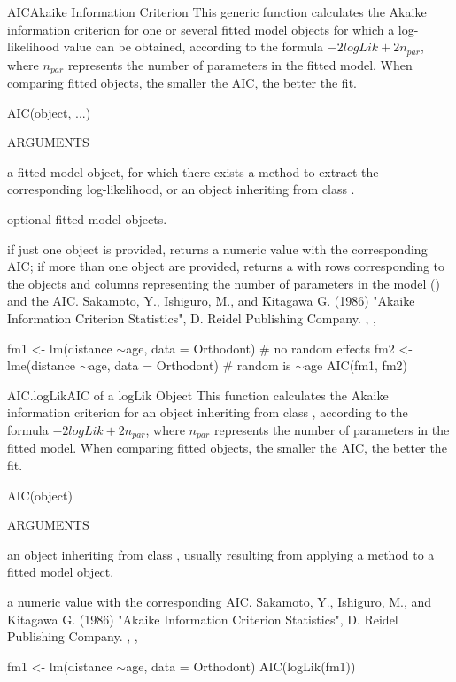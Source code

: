 \documentclass[pdftex]{article} \usepackage{url,graphicx}
\renewcommand{\Twiddle}{\mbox{\(\sim\)}}
\begin{document}
\begin{Helpfile}{AIC}{Akaike Information Criterion}
  This generic function calculates the Akaike information criterion
  for one or several fitted model objects for which a log-likelihood
  value can be obtained, according to the formula $-2logLik +
  2n_{par}$, where $n_{par}$ represents the number of parameters in
  the fitted model. When comparing fitted objects, the smaller the
  AIC, the better the fit.
\begin{Example}
AIC(object, ...)
\end{Example}
\begin{Argument}{ARGUMENTS}
\item[\Co{object:}]
a fitted model object, for which there exists a
 method to extract the corresponding log-likelihood, or
an object inheriting from class .
\item[\Co{...:}]
optional fitted model objects.
\end{Argument}
if just one object is provided, returns a numeric value
with the corresponding AIC; if more than one object are provided,
returns a  with rows corresponding to the objects and
columns representing the number of parameters in the model
() and the AIC.
Sakamoto, Y., Ishiguro, M., and Kitagawa G. (1986) "Akaike
Information Criterion Statistics", D. Reidel Publishing Company.
, , 
\need 15pt
\vspace{-16pt} 
\begin{Example}
fm1 <- lm(distance \Twiddle age, data = Orthodont) # no random effects
fm2 <- lme(distance \Twiddle age, data = Orthodont) # random is \Twiddle age
AIC(fm1, fm2)
\end{Example}
\end{Helpfile}
\begin{Helpfile}{AIC.logLik}{AIC of a logLik Object}
  This function calculates the Akaike information criterion for an
  object inheriting from class , according to the formula
  $-2logLik + 2n_{par}$, where $n_{par}$ represents the number of
  parameters in the fitted model. When comparing fitted objects, the
  smaller the AIC, the better the fit.
\begin{Example}
AIC(object)
\end{Example}
\begin{Argument}{ARGUMENTS}
\item[\Co{object:}]
an object inheriting from class , usually
resulting from applying a  method to a fitted model
object.
\end{Argument}
a numeric value with the corresponding AIC.
Sakamoto, Y., Ishiguro, M., and Kitagawa G. (1986) "Akaike
Information Criterion Statistics", D. Reidel Publishing Company.
, , 
\need 15pt
\vspace{-16pt} 
\begin{Example}
fm1 <- lm(distance \Twiddle age, data = Orthodont) 
AIC(logLik(fm1))
\end{Example}
\end{Helpfile}
\end{document}
